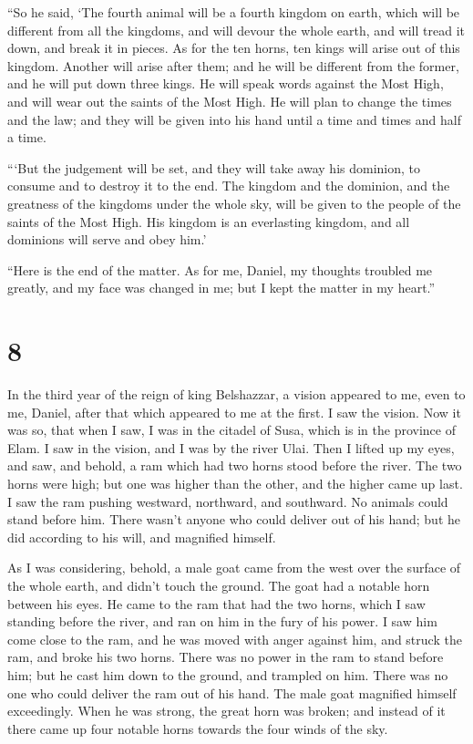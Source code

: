  ``So he said, `The fourth animal will be a fourth kingdom
on earth, which will be different from all the kingdoms, and will devour
the whole earth, and will tread it down, and break it in pieces.
 As for the ten horns, ten kings will arise out of this
kingdom. Another will arise after them; and he will be different from
the former, and he will put down three kings.  He will
speak words against the Most High, and will wear out the saints of the
Most High. He will plan to change the times and the law; and they will
be given into his hand until a time and times and half a time.

 ```But the judgement will be set, and they will take away
his dominion, to consume and to destroy it to the end.  The
kingdom and the dominion, and the greatness of the kingdoms under the
whole sky, will be given to the people of the saints of the Most High.
His kingdom is an everlasting kingdom, and all dominions will serve and
obey him.'

 ``Here is the end of the matter. As for me, Daniel, my
thoughts troubled me greatly, and my face was changed in me; but I kept
the matter in my heart.''

\hypertarget{section-7}{%
\section{8}\label{section-7}}

 In the third year of the reign of king Belshazzar, a vision
appeared to me, even to me, Daniel, after that which appeared to me at
the first.  I saw the vision. Now it was so, that when I
saw, I was in the citadel of Susa, which is in the province of Elam. I
saw in the vision, and I was by the river Ulai.  Then I
lifted up my eyes, and saw, and behold, a ram which had two horns stood
before the river. The two horns were high; but one was higher than the
other, and the higher came up last.  I saw the ram pushing
westward, northward, and southward. No animals could stand before him.
There wasn't anyone who could deliver out of his hand; but he did
according to his will, and magnified himself.

 As I was considering, behold, a male goat came from the
west over the surface of the whole earth, and didn't touch the ground.
The goat had a notable horn between his eyes.  He came to
the ram that had the two horns, which I saw standing before the river,
and ran on him in the fury of his power.  I saw him come
close to the ram, and he was moved with anger against him, and struck
the ram, and broke his two horns. There was no power in the ram to stand
before him; but he cast him down to the ground, and trampled on him.
There was no one who could deliver the ram out of his hand. 
The male goat magnified himself exceedingly. When he was strong, the
great horn was broken; and instead of it there came up four notable
horns towards the four winds of the sky.

